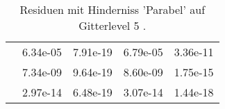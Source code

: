 \begin{table}
\begin{tabular}{c|cc|cc|}
\multicolumn{1}{|c|}{} & \multicolumn{1}{|c|}{  6.34e-05} & \multicolumn{1}{|c|}{  7.91e-19} & \multicolumn{1}{|c|}{  6.79e-05} & \multicolumn{1}{|c|}{  3.36e-11} \\ 
\multicolumn{1}{|c|}{} & \multicolumn{1}{|c|}{  7.34e-09} & \multicolumn{1}{|c|}{  9.64e-19} & \multicolumn{1}{|c|}{  8.60e-09} & \multicolumn{1}{|c|}{  1.75e-15} \\ 
\multicolumn{1}{|c|}{} & \multicolumn{1}{|c|}{  2.97e-14} & \multicolumn{1}{|c|}{  6.48e-19} & \multicolumn{1}{|c|}{  3.07e-14} & \multicolumn{1}{|c|}{  1.44e-18} \\ 
\hline 
\end{tabular}\caption{Residuen mit Hinderniss 'Parabel' auf Gitterlevel 5 .}\label{tab:Residuum_Parabel_level5}
\end{table} 
